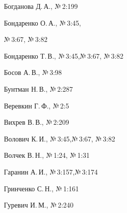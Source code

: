\begin{theindex}
\thispagestyle{empty}





  \indexspace





\item Богданова Д.\,А., №\,2:199


\item Бондаренко О.\,А., №\,3:45,\newline 


 №\,3:67, №\,3:82


\item Бондаренко Т.\,В., №\,3:45,\newline  №\,3:67, №\,3:82


\item Босов А.\,В., №\,3:98


\item Бунтман Н.\,В., №\,2:287





  \indexspace





\item Веревкин Г.\,Ф., №\,2:5


\item Вихрев В.\,В., №\,2:209


\item Волович К.\,И., №\,3:45,\newline №\,3:67, №\,3:82


\item Волчек В.\,Н., №\,1:24, №\,1:31





  \indexspace





\item Гаранин А.\,И., №\,3:157,\newline №\,3:174


\item Гринченко С.\,Н., №\,1:161


\item Гуревич И.\,М., №\,2:240





  \indexspace






\end{theindex}
